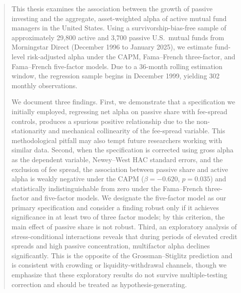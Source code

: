 \documentclass[11pt, a4paper]{article}
\begin{document}
\begin{abstract}
\noindent
This thesis examines the association between the growth of passive investing and the aggregate, asset-weighted alpha of active mutual fund managers in the United States. Using a survivorship-bias-free sample of approximately 29,800 active and 3,700 passive U.S.\ mutual funds from Morningstar Direct (December 1996 to January 2025), we estimate fund-level risk-adjusted alpha under the CAPM, Fama--French three-factor, and Fama--French five-factor models. Due to a 36-month rolling estimation window, the regression sample begins in December 1999, yielding 302 monthly observations.

We document three findings. First, we demonstrate that a specification we initially employed, regressing net alpha on passive share with fee-spread controls, produces a spurious positive relationship due to the non-stationarity and mechanical collinearity of the fee-spread variable. This methodological pitfall may also tempt future researchers working with similar data. Second, when the specification is corrected using gross alpha as the dependent variable, Newey--West HAC standard errors, and the exclusion of fee spread, the association between passive share and active alpha is weakly negative under the CAPM ($\beta = -0.620$, $p = 0.035$) and statistically indistinguishable from zero under the Fama--French three-factor and five-factor models. We designate the five-factor model as our primary specification and consider a finding robust only if it achieves significance in at least two of three factor models; by this criterion, the main effect of passive share is not robust. Third, an exploratory analysis of stress-conditional interactions reveals that during periods of elevated credit spreads and high passive concentration, multifactor alpha declines significantly. This is the opposite of the Grossman--Stiglitz prediction and is consistent with crowding or liquidity-withdrawal channels, though we emphasize that these exploratory results do not survive multiple-testing correction and should be treated as hypothesis-generating.

\end{abstract}

\newpage
\tableofcontents
\newpage
\listoftables
\listoffigures
\newpage

\end{document}
